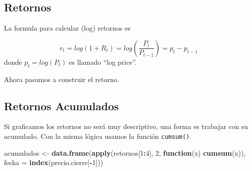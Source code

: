 \documentclass[12pt,]{book}
\newenvironment{Shaded}{\begin{snugshade}}{\end{snugshade}}
\newcommand{\KeywordTok}[1]{\textcolor[rgb]{0.13,0.29,0.53}{\textbf{#1}}}
\newcommand{\DataTypeTok}[1]{\textcolor[rgb]{0.13,0.29,0.53}{#1}}
\newcommand{\DecValTok}[1]{\textcolor[rgb]{0.00,0.00,0.81}{#1}}
\newcommand{\StringTok}[1]{\textcolor[rgb]{0.31,0.60,0.02}{#1}}
\newcommand{\ControlFlowTok}[1]{\textcolor[rgb]{0.13,0.29,0.53}{\textbf{#1}}}
\newcommand{\OperatorTok}[1]{\textcolor[rgb]{0.81,0.36,0.00}{\textbf{#1}}}
\newcommand{\NormalTok}[1]{#1}
\begin{document}
\subsection{Retornos}\label{retornos}

La formula para calcular (log) retornos es

\[
r_t = log(1 + R_t) = log(\frac{P_t}{P_{t-1}}) = p_t - p_{t-1}
\] donde \(p_t = log(P_t)\) es llamado ``log price''.

Ahora pasamos a construir el retorno.

\begin{Shaded}
\end{Shaded}

\subsection{Retornos Acumulados}\label{retornos-acumulados}

Si graficamos los retornos no será muy descriptivo, una forma es
trabajar con su acumulado. Con la misma lógica usamos la función
\texttt{cumsum()}.

\begin{Shaded}
\begin{Highlighting}[]
\NormalTok{acumulados <-}\StringTok{ }\KeywordTok{data.frame}\NormalTok{(}\KeywordTok{apply}\NormalTok{(retornos[}\DecValTok{1}\OperatorTok{:}\DecValTok{4}\NormalTok{], }\DecValTok{2}\NormalTok{, }\ControlFlowTok{function}\NormalTok{(x) }\KeywordTok{cumsum}\NormalTok{(x)), }\DataTypeTok{fecha =} \KeywordTok{index}\NormalTok{(precio.cierre[}\OperatorTok{-}\DecValTok{1}\NormalTok{]))}
\end{Highlighting}
\end{Shaded}
\end{document}
